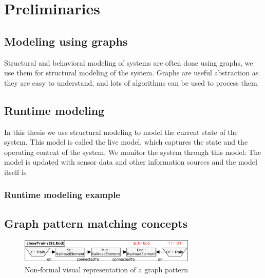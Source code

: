 
\chapter{Preliminaries}



\section{Modeling using graphs}

Structural and behavioral modeling of systems are often done using graphs, we use them for structural modeling of the system. Graphs are useful abstraction as they are easy to understand, and lots of algorithms can be used to process them.

\section{Runtime modeling}

In this thesis we use structural modeling to model the current state of the system. This model is called the live model, which captures the state and the operating context of the system. We monitor the system through this model: The model is updated with sensor data and other information sources and the model itself is 

\subsection{Runtime modeling example}



\section{Graph pattern matching concepts}

\begin{figure}[h]
	\begin{center}
		\includegraphics[width=0.75\textwidth]{figures/pattern-visual.pdf}
		\caption{Non-formal visual representation of a graph pattern}
		\label{pattern-visual}
	\end{center}
\end{figure}

